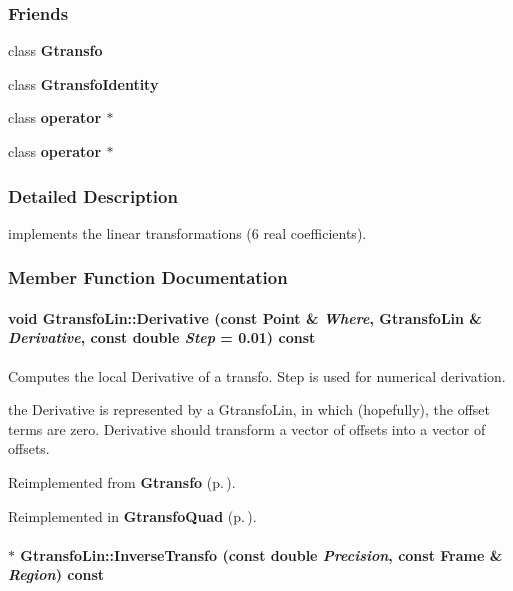\subsubsection*{Friends}
\begin{CompactItemize}
\item 
class {\bf Gtransfo}
\item 
class {\bf Gtransfo\-Identity}
\item 
class {\bf operator $\ast$}
\item 
class {\bf operator $\ast$}
\end{CompactItemize}


\subsubsection{Detailed Description}
implements the linear transformations (6 real coefficients).



\subsubsection{Member Function Documentation}
\paragraph{\setlength{\rightskip}{0pt plus 5cm}void Gtransfo\-Lin::Derivative (const {\bf Point} \& {\em Where}, Gtransfo\-Lin \& {\em Derivative}, const double {\em Step} = 0.01) const\hspace{0.3cm}{\tt  [virtual]}}\hfill\label{class_gtransfolin_a5}


Computes the local Derivative of a transfo. Step is used for numerical derivation.

the Derivative is represented by a Gtransfo\-Lin, in which (hopefully), the offset terms are zero. Derivative should  transform a vector of offsets into a vector of offsets. 

Reimplemented from {\bf Gtransfo} {\rm (p.\,\pageref{class_gtransfo_a9})}.

Reimplemented in {\bf Gtransfo\-Quad} {\rm (p.\,\pageref{class_gtransfoquad_a9})}.
\paragraph{$\ast$ Gtransfo\-Lin::Inverse\-Transfo (const double {\em Precision}, const {\bf Frame} \& {\em Region}) const\hspace{0.3cm}{\tt  [virtual]}}\hfill\label{class_gtransfolin_a14}


